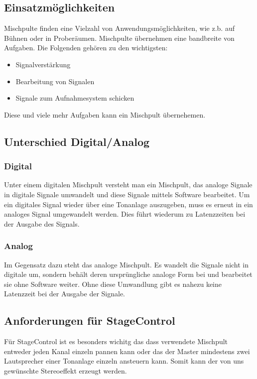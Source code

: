 \subsection{Einsatzmöglichkeiten}
Mischpulte finden eine Vielzahl von Anwendungsmöglichkeiten, wie z.b. auf Bühnen oder in Proberäumen. Mischpulte übernehmen eine bandbreite von Aufgaben. Die Folgenden gehören zu den wichtigsten:
\begin{itemize}
	\item Signalverstärkung
	\item Bearbeitung von Signalen
	\item Signale zum Aufnahmesystem schicken
\end{itemize}
Diese und viele mehr Aufgaben kann ein Mischpult übernehemen. \\
\cite{Mischpult_Verwendungszweck}

\subsection{Unterschied Digital/Analog}
\subsubsection{Digital}
Unter einem digitalen Mischpult versteht man ein Mischpult, das analoge Signale in digitale Signale umwandelt und diese Signale mittels Software bearbeitet. Um ein digitales Signal wieder über eine Tonanlage auszugeben, muss es erneut in ein analoges Signal umgewandelt werden. Dies führt wiederum zu Latenzzeiten bei der Ausgabe des Signals.
\subsubsection{Analog}
Im Gegensatz dazu steht das analoge Mischpult. Es wandelt die Signale nicht in digitale um, sondern behält deren ursprüngliche analoge Form bei und bearbeitet sie ohne Software weiter. Ohne diese Umwandlung gibt es nahezu keine Latenzzeit bei der Ausgabe der Signale. \\
\cite{Mischpult_Analog/Digital}

\subsection{Anforderungen für StageControl}
Für StageControl ist es besonders wichitg das dass verwendete Mischpult entweder jeden Kanal einzeln pannen kann oder das der Master mindestens zwei Lautsprecher einer Tonanlage einzeln ansteuern kann. Somit kann der von uns gewünschte Stereoeffekt erzeugt werden.


